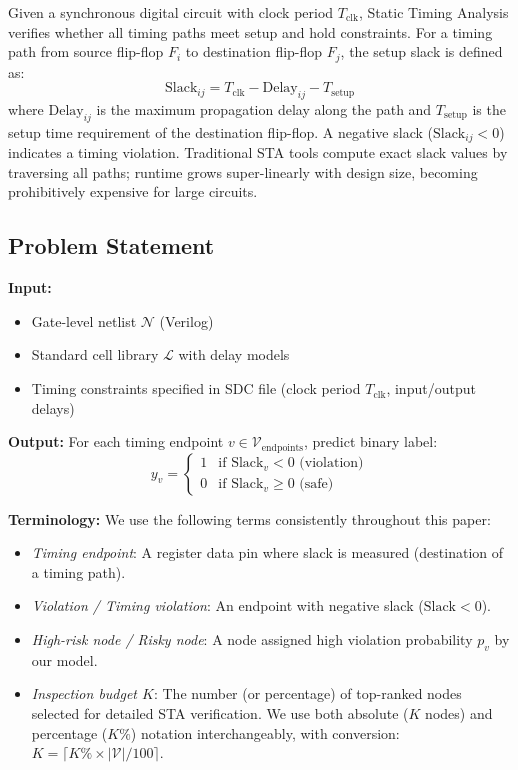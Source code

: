 \documentclass[10pt,twocolumn,journal]{IEEEtran}
\begin{document}
Given a synchronous digital circuit with clock period $T_{\text{clk}}$, Static Timing Analysis verifies whether all timing paths meet setup and hold constraints. For a timing path from source flip-flop $F_i$ to destination flip-flop $F_j$, the setup slack is defined as:
\begin{equation}
\text{Slack}_{ij} = T_{\text{clk}} - \text{Delay}_{ij} - T_{\text{setup}}
\label{eq:slack}
\end{equation}
where $\text{Delay}_{ij}$ is the maximum propagation delay along the path and $T_{\text{setup}}$ is the setup time requirement of the destination flip-flop. A negative slack ($\text{Slack}_{ij} < 0$) indicates a timing violation. Traditional STA tools compute exact slack values by traversing all paths; runtime grows super-linearly with design size, becoming prohibitively expensive for large circuits.

\subsection{Problem Statement}

\textbf{Input:}
\begin{itemize}
    \item Gate-level netlist $\mathcal{N}$ (Verilog)
    \item Standard cell library $\mathcal{L}$ with delay models
    \item Timing constraints specified in SDC file (clock period $T_{\text{clk}}$, input/output delays)
\end{itemize}

\textbf{Output:}
For each timing endpoint $v \in \mathcal{V}_{\text{endpoints}}$, predict binary label:
\begin{equation}
y_v = \begin{cases}
1 & \text{if } \text{Slack}_v < 0 \text{ (violation)} \\
0 & \text{if } \text{Slack}_v \geq 0 \text{ (safe)}
\end{cases}
\label{eq:label}
\end{equation}

\textbf{Terminology:} We use the following terms consistently throughout this paper:
\begin{itemize}
    \item \textit{Timing endpoint}: A register data pin where slack is measured (destination of a timing path).
    \item \textit{Violation / Timing violation}: An endpoint with negative slack ($\text{Slack} < 0$).
    \item \textit{High-risk node / Risky node}: A node assigned high violation probability $p_v$ by our model.
    \item \textit{Inspection budget $K$}: The number (or percentage) of top-ranked nodes selected for detailed STA verification. We use both absolute ($K$ nodes) and percentage ($K\%$) notation interchangeably, with conversion: $K = \lceil K\% \times |\mathcal{V}| / 100 \rceil$.
\end{itemize}
\end{document}
